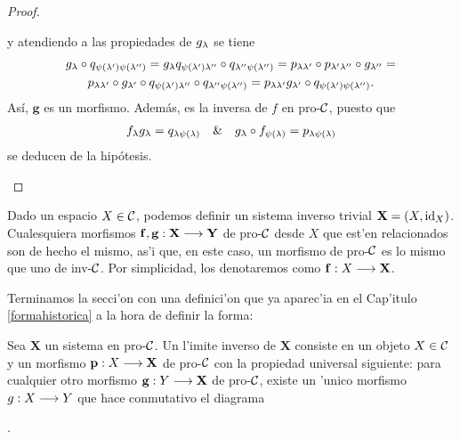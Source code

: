 \begin{proof}
\begin{itemize}
\begin{center}
\begin{tikzcd}
      \end{tikzcd}
    \end{center}
    y atendiendo a las propiedades de $g_\lam$ se tiene
    \begin{gather*}
      g_\lam \circ q_{\psi(\lam')\psi(\lam'')} = g_\lam q_{\psi(\lam')\lam''}\circ q_{\lam''\psi(\lam'')} = p_{\lam\lam'}\circ p_{\lam'\lam''} \circ g_{\lam''} =\\ p_{\lam\lam'}\circ g_{\lam'} \circ q_{\psi(\lam')\lam''} \circ q_{\lam''\psi(\lam'')} = p_{\lam\lam'}g_{\lam'}\circ q_{\psi(\lam')\psi(\lam'')}.
    \end{gather*}
    Así, $ \mathbf{g }  $ es un morfismo. Además, es la inversa de $ f  $ en pro-$ \ccal  $, puesto que 
    \begin{gather*}
      f_\lam g_\lam = q_{\lam\psi(\lam )} \quad \& \quad g_\lam\circ f_{\psi(\lam)} = p_{\lam\psi(\lam )}
    \end{gather*}
    se deducen de la hipótesis.
  \end{itemize}
\end{proof}
\begin{observation}
    Dado un espacio $ X\in \ccal  $, podemos definir un sistema inverso trivial $ \mathbf{X} = (X,\id_X) $. Cualesquiera morfismos $ \mathbf{f},\mathbf{g}:\mathbf{X}\lra \mathbf{Y} $ de pro-$ \ccal  $ desde $X$ que est'en relacionados son de hecho el mismo, as'i que, en este caso, un morfismo de pro-$ \ccal  $ es lo mismo que uno de inv-$ \ccal  $. Por simplicidad, los denotaremos como $ \mathbf{f}:X\lra \mathbf{X} $.
\end{observation}
Terminamos la secci'on con una definici'on que ya aparec'ia en el Cap'itulo \ref{formahistorica} a la hora de definir la forma:
\begin{definition}
    Sea $ \mathbf{X}$ un sistema en pro-$ \ccal  $. Un l'imite inverso de $ \mathbf{X} $ consiste en un objeto $ X \in\ccal  $ y un morfismo $ \mathbf{p}:X\lra \mathbf{X} $ de pro-$ \ccal  $ con la propiedad universal siguiente: para cualquier otro morfismo $ \mathbf{g}:Y\lra \mathbf{X} $ de pro-$ \ccal  $, existe un 'unico morfismo $ g:X\lra Y  $ que hace conmutativo el diagrama
    \begin{center}
        .
    \end{center}
\end{definition}

